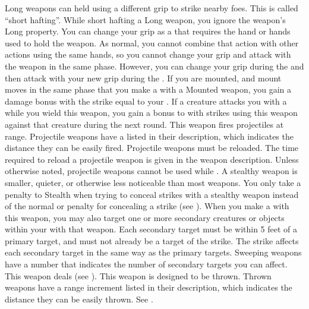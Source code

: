             Long weapons can held using a different grip to strike nearby foes.
            This is called ``short hafting''.
            While short hafting a Long weapon, you ignore the weapon's Long property.
            You can change your grip as a  that requires the hand or hands used to hold the weapon.
            As normal, you cannot combine that action with other actions using the same hands, so you cannot change your grip and attack with the weapon in the same phase.
            However, you can change your grip during the  and then attack with your new grip during the .
            \label{Mounted Weapon} If you are mounted, and mount moves in the same phase that you make a  with a Mounted weapon, you gain a damage bonus with the strike equal to your .
             If a creature attacks you with a  while you wield this weapon, you gain a  bonus to  with strikes using this weapon against that creature during the next round.
             This weapon fires projectiles at range. Projectile weapons have a  listed in their description, which indicates the distance they can be easily fired. Projectile weapons must be reloaded. The time required to reload a projectile weapon is given in the weapon description.
            Unless otherwise noted, projectile weapons cannot be used while \prone.
            A stealthy weapon is smaller, quieter, or otherwise less noticeable than most weapons.
            You only take a  penalty to Stealth when trying to conceal strikes with a stealthy weapon instead of the normal  or  penalty for concealing a strike (see ).
            \label{Sweeping} When you make a   with this weapon, you may also target one or more secondary creatures or objects within your  with that weapon.
            Each secondary target must be within 5 feet of a primary target, and must not already be a target of the strike.
            The strike affects each secondary target in the same way as the primary targets.
            Sweeping weapons have a number that indicates the number of secondary targets you can affect.
             This weapon deals  (see ).
             This weapon is designed to be thrown. Thrown weapons have a range increment listed in their description, which indicates the distance they can be easily thrown. See .
